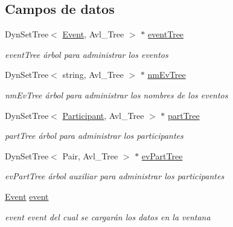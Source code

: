 \subsection*{Campos de datos}
\begin{DoxyCompactItemize}
\item 
Dyn\+Set\+Tree$<$ \hyperlink{class_event}{Event}, Avl\+\_\+\+Tree $>$ $\ast$ \hyperlink{class_view_event_window_abd2eb5de94df8494ee40fe415345df82}{event\+Tree}\hypertarget{class_view_event_window_abd2eb5de94df8494ee40fe415345df82}{}\label{class_view_event_window_abd2eb5de94df8494ee40fe415345df82}

\begin{DoxyCompactList}\small\item\em event\+Tree árbol para administrar los eventos \end{DoxyCompactList}\item 
Dyn\+Set\+Tree$<$ string, Avl\+\_\+\+Tree $>$ $\ast$ \hyperlink{class_view_event_window_adb04549d83a31b181e9e30b8eab928de}{nm\+Ev\+Tree}\hypertarget{class_view_event_window_adb04549d83a31b181e9e30b8eab928de}{}\label{class_view_event_window_adb04549d83a31b181e9e30b8eab928de}

\begin{DoxyCompactList}\small\item\em nm\+Ev\+Tree árbol para administrar los nombres de los eventos \end{DoxyCompactList}\item 
Dyn\+Set\+Tree$<$ \hyperlink{class_participant}{Participant}, Avl\+\_\+\+Tree $>$ $\ast$ \hyperlink{class_view_event_window_a7441ec3b0af9820d62c51a8d6da8c798}{part\+Tree}\hypertarget{class_view_event_window_a7441ec3b0af9820d62c51a8d6da8c798}{}\label{class_view_event_window_a7441ec3b0af9820d62c51a8d6da8c798}

\begin{DoxyCompactList}\small\item\em part\+Tree árbol para administrar los participantes \end{DoxyCompactList}\item 
Dyn\+Set\+Tree$<$ Pair, Avl\+\_\+\+Tree $>$ $\ast$ \hyperlink{class_view_event_window_a97cd14a17389087aaf93daa48f283400}{ev\+Part\+Tree}\hypertarget{class_view_event_window_a97cd14a17389087aaf93daa48f283400}{}\label{class_view_event_window_a97cd14a17389087aaf93daa48f283400}

\begin{DoxyCompactList}\small\item\em ev\+Part\+Tree árbol auxiliar para administrar los participantes \end{DoxyCompactList}\item 
\hyperlink{class_event}{Event} \hyperlink{class_view_event_window_a54296d443c15b3e7593e826bb9525b2e}{event}\hypertarget{class_view_event_window_a54296d443c15b3e7593e826bb9525b2e}{}\label{class_view_event_window_a54296d443c15b3e7593e826bb9525b2e}

\begin{DoxyCompactList}\small\item\em event event del cual se cargarán los datos en la ventana \end{DoxyCompactList}\end{DoxyCompactItemize}


